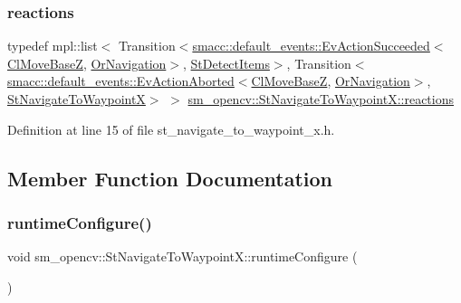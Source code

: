 \subsubsection{\texorpdfstring{reactions}{reactions}}
{\footnotesize\ttfamily typedef mpl\+::list$<$ Transition$<$\hyperlink{structsmacc_1_1default__events_1_1EvActionSucceeded}{smacc\+::default\+\_\+events\+::\+Ev\+Action\+Succeeded}$<$\hyperlink{classcl__move__base__z_1_1ClMoveBaseZ}{Cl\+Move\+BaseZ}, \hyperlink{classsm__opencv_1_1OrNavigation}{Or\+Navigation}$>$, \hyperlink{structsm__opencv_1_1StDetectItems}{St\+Detect\+Items}$>$, Transition$<$\hyperlink{structsmacc_1_1default__events_1_1EvActionAborted}{smacc\+::default\+\_\+events\+::\+Ev\+Action\+Aborted}$<$\hyperlink{classcl__move__base__z_1_1ClMoveBaseZ}{Cl\+Move\+BaseZ}, \hyperlink{classsm__opencv_1_1OrNavigation}{Or\+Navigation}$>$, \hyperlink{structsm__opencv_1_1StNavigateToWaypointX}{St\+Navigate\+To\+WaypointX}$>$ $>$ \hyperlink{structsm__opencv_1_1StNavigateToWaypointX_ae17d020f304fbaa258896d70d9ada928}{sm\+\_\+opencv\+::\+St\+Navigate\+To\+Waypoint\+X\+::reactions}}



Definition at line 15 of file st\+\_\+navigate\+\_\+to\+\_\+waypoint\+\_\+x.\+h.



\subsection{Member Function Documentation}
\mbox{\label{structsm__opencv_1_1StNavigateToWaypointX_a33d6eaf7751ac344d92b226ecdedb8cf}} 
\subsubsection{\texorpdfstring{runtime\+Configure()}{runtimeConfigure()}}
{\footnotesize\ttfamily void sm\+\_\+opencv\+::\+St\+Navigate\+To\+Waypoint\+X\+::runtime\+Configure (\begin{DoxyParamCaption}{ }\end{DoxyParamCaption})\hspace{0.3cm}{\ttfamily [inline]}}




